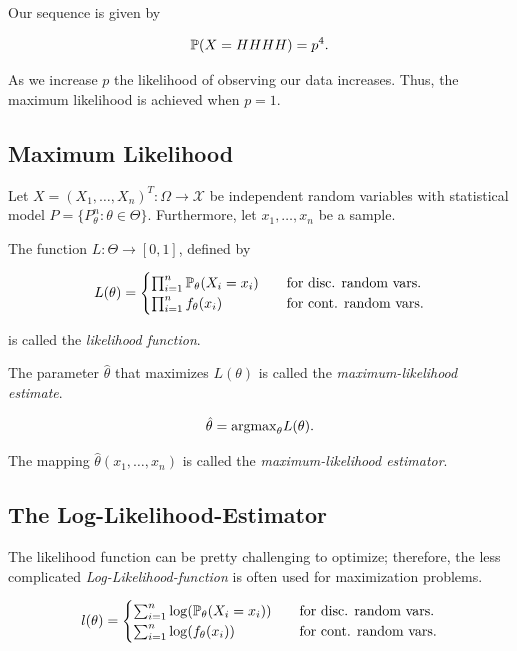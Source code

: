 Our sequence is given by

\[
    \mathbb{P}(X = HHHH) = p^4.
\]

As we increase \(p\) the likelihood of observing our data increases. Thus, the maximum likelihood is achieved when \(p = 1\).

\subsection{Maximum Likelihood}

Let \(X = (X_{1}, \ldots, X_{n})^{T} : \Omega \to \mathcal{X}\) be independent random variables with
statistical model \(P = \{ P^{n}_{\theta} : \theta \in \Theta \}\). Furthermore, let \(x_{1}, \ldots, x_{n}\) be a sample.

The function \(L : \Theta \to [0,1]\), defined by

\[
    L(\theta) = 
    \begin{cases}
        \prod_{i = 1}^{n} \mathbb{P}_{\theta} (X_i = x_i)  & \quad \text{for disc. random vars.} \\ 
        \prod_{i = 1}^{n} f_{\theta} (x_i) & \quad \text{for cont. random vars.}
    \end{cases}
\]

is called the \emph{likelihood function}.

The parameter \(\hat{\theta}\) that maximizes \(L(\theta)\) is called the \emph{maximum-likelihood estimate}.

\[
    \hat{\theta} =  \mathrm{argmax}_{\theta} L(\theta).
\]

The mapping \(\hat{\theta}(x_{1}, \ldots, x_{n})\) is called the \emph{maximum-likelihood estimator}.

\subsection{The Log-Likelihood-Estimator}

The likelihood function can be pretty challenging to optimize; therefore, the less complicated \emph{Log-Likelihood-function} is often used for maximization
problems. 

\[
    l(\theta) = 
    \begin{cases}
        \sum_{i = 1}^{n} \log(\mathbb{P}_{\theta} (X_i = x_i)) & \quad \text{for disc. random vars.} \\
        \sum_{i = 1}^{n} \log( f_\theta(x_i)) & \quad \text{for cont. random vars.}
    \end{cases}
\]

